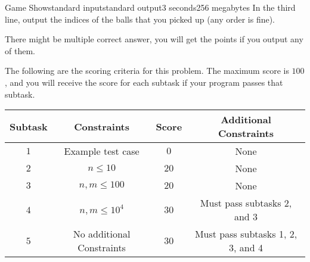\begin{problem}{Game Show}{standard input}{standard output}{3 seconds}{256 megabytes}
In the third line, output the indices of the balls that you picked up (any order is fine).

There might be multiple correct answer, you will get the points if you output any of them.

\Scoring
The following are the scoring criteria for this problem. The maximum score is $100$, and you will receive the score for each subtask if your program passes that subtask.

\begin{center}
  \begin{tabular}{ | c | c | c | c | } \hline
    \bf{Subtask} &
    \bf{Constraints} &
    \bf{Score} &
    \bf{Additional Constraints} \\ \hline
    $1$ & Example test case & $0$ & None \\ \hline
    $2$ & $n \le 10$ & $20$ & None \\ \hline
    $3$ & $n, m \le 100$ & $20$ & None \\ \hline
    $4$ & $n, m \le 10^4$ & $30$ & Must pass subtasks 2, and 3 \\ \hline
    $5$ & No additional Constraints & $30$ & Must pass subtasks 1, 2, 3, and 4 \\ \hline
    \end{tabular}
\end{center}

\Examples

\begin{example}
%
%
%
\end{example}

\end{problem}

